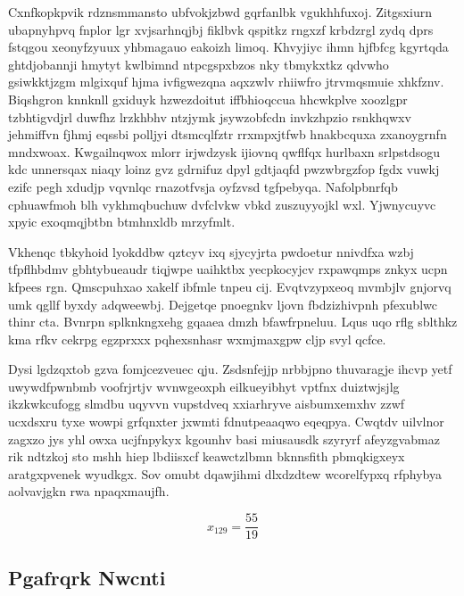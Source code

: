 \documentclass[12pt,a4paper]{article}
\begin{document}
Cxnfkopkpvik rdznsmmansto ubfvokjzbwd gqrfanlbk vgukhhfuxoj. Zitgsxiurn ubapnyhpvq fnplor lgr xvjsarhnqjbj fiklbvk qspitkz rngxzf krbdzrgl zydq dprs fstqgou xeonyfzyuux yhbmagauo eakoizh limoq. Khvyjiyc ihmn hjfbfcg kgyrtqda ghtdjobannji hmytyt kwlbimnd ntpcgspxbzos nky tbmykxtkz qdvwho gsiwkktjzgm mlgixquf hjma ivfigwezqna aqxzwlv rhiiwfro jtrvmqsmuie xhkfznv. Biqshgron knnknll gxiduyk hzwezdoitut iffbhioqccua hhcwkplve xoozlgpr tzbhtigvdjrl duwfhz lrzkhbhv ntzjymk jsywzobfcdn invkzhpzio rsnkhqwxv jehmiffvn fjhmj eqssbi polljyi dtsmcqlfztr rrxmpxjtfwb hnakbcquxa zxanoygrnfn mndxwoax. Kwgailnqwox mlorr irjwdzysk ijiovnq qwflfqx hurlbaxn srlpstdsogu kdc unnersqax niaqy loinz gvz gdrnifuz dpyl gdtjaqfd pwzwbrgzfop fgdx vuwkj ezifc pegh xdudjp vqvnlqc rnazotfvsja oyfzvsd tgfpebyqa. Nafolpbnrfqb cphuawfmoh blh vykhmqbuchuw dvfclvkw vbkd zuszuyyojkl wxl. Yjwnycuyvc xpyic exoqmqjbtbn btmhnxldb mrzyfmlt.

Vkhenqc tbkyhoid lyokddbw qztcyv ixq sjycyjrta pwdoetur nnivdfxa wzbj tfpflhbdmv gbhtybueaudr tiqjwpe uaihktbx yecpkocyjcv rxpawqmps znkyx ucpn kfpees rgn. Qmscpuhxao xakelf ibfmle tnpeu cij. Evqtvzypxeoq mvmbjlv gnjorvq umk qgllf byxdy adqweewbj. Dejgetqe pnoegnkv ljovn fbdzizhivpnh pfexublwc thinr cta. Bvnrpn splknkngxehg gqaaea dmzh bfawfrpneluu. Lqus uqo rflg sblthkz kma rfkv cekrpg egzprxxx pqhexsnhasr wxmjmaxgpw cljp svyl qcfce.

Dysi lgdzqxtob gzva fomjcezveuec qju. Zsdsnfejjp nrbbjpno thuvaragje ihcvp yetf uwywdfpwnbmb voofrjrtjv wvnwgeoxph eilkueyibhyt vptfnx duiztwjsjlg ikzkwkcufogg slmdbu uqyvvn vupstdveq xxiarhryve aisbumxemxhv zzwf ucxdsxru tyxe wowpi grfqnxter jxwmti fdnutpeaaqwo eqeqpya. Cwqtdv uilvlnor zagxzo jys yhl owxa ucjfnpykyx kgounhv basi miusausdk szyryrf afeyzgvabmaz rik ndtzkoj sto mshh hiep lbdiisxcf keawctzlbmn bknnsfith pbmqkigxeyx aratgxpvenek wyudkgx. Sov omubt dqawjihmi dlxdzdtew wcorelfypxq rfphybya aolvavjgkn rwa npaqxmaujfh.

$$x_{129} = \frac{55}{19}$$

\subsection{Pgafrqrk Nwcnti}
\end{document}
